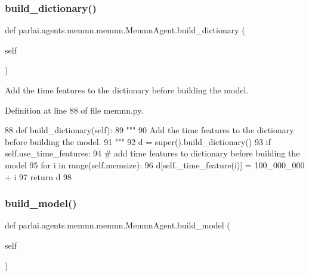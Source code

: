 \subsubsection{\texorpdfstring{build\+\_\+dictionary()}{build\_dictionary()}}
{\footnotesize\ttfamily def parlai.\+agents.\+memnn.\+memnn.\+Memnn\+Agent.\+build\+\_\+dictionary (\begin{DoxyParamCaption}\item[{}]{self }\end{DoxyParamCaption})}

\begin{DoxyVerb}Add the time features to the dictionary before building the model.
\end{DoxyVerb}
 

Definition at line 88 of file memnn.\+py.


\begin{DoxyCode}
88     \textcolor{keyword}{def }build\_dictionary(self):
89         \textcolor{stringliteral}{"""}
90 \textcolor{stringliteral}{        Add the time features to the dictionary before building the model.}
91 \textcolor{stringliteral}{        """}
92         d = super().build\_dictionary()
93         \textcolor{keywordflow}{if} self.use\_time\_features:
94             \textcolor{comment}{# add time features to dictionary before building the model}
95             \textcolor{keywordflow}{for} i \textcolor{keywordflow}{in} range(self.memsize):
96                 d[self.\_time\_feature(i)] = 100\_000\_000 + i
97         \textcolor{keywordflow}{return} d
98 
\end{DoxyCode}
\mbox{\label{classparlai_1_1agents_1_1memnn_1_1memnn_1_1MemnnAgent_aa5b5782548443a008c0502ec9ddedee2}} 
\subsubsection{\texorpdfstring{build\+\_\+model()}{build\_model()}}
{\footnotesize\ttfamily def parlai.\+agents.\+memnn.\+memnn.\+Memnn\+Agent.\+build\+\_\+model (\begin{DoxyParamCaption}\item[{}]{self }\end{DoxyParamCaption})}

